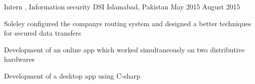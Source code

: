 \begin{cventries}
	\cventry
	{Intern , Information security} %
	{DSI} %
	{Islamabad, Pakistan} %
	{May 2015 August 2015} %
	{
		\begin{cvitems} %
			\item {Soleley configured the companys routing system and designed a better techniques for secured data transfers}
			\item {Development of an online app which worked simultaneously on two distributive hardwares}
			\item{ Development of a desktop app using C-sharp}
		\end{cvitems}
	}	
\end{cventries}